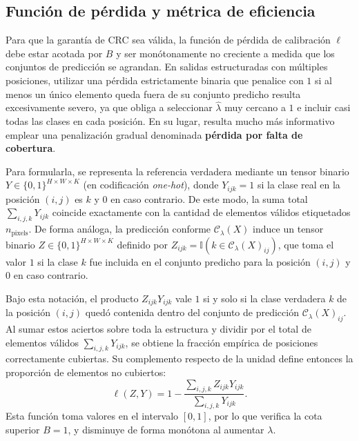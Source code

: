 \subsection{Función de pérdida y métrica de eficiencia}

Para que la garantía de CRC sea válida, la función de pérdida de calibración $\ell$ debe estar acotada por $B$ y ser monótonamente no creciente a medida que los conjuntos de predicción se agrandan. En salidas estructuradas con múltiples posiciones, utilizar una pérdida estrictamente binaria que penalice con $1$ si al menos un único elemento queda fuera de su conjunto predicho resulta excesivamente severo, ya que obliga a seleccionar $\hat{\lambda}$ muy cercano a $1$ e incluir casi todas las clases en cada posición. En su lugar, resulta mucho más informativo emplear una penalización gradual denominada \textbf{pérdida por falta de cobertura}.

Para formularla, se representa la referencia verdadera mediante un tensor binario $Y \in \{0,1\}^{H \times W \times K}$ (en codificación \textit{one-hot}), donde $Y_{ijk} = 1$ si la clase real en la posición $(i,j)$ es $k$ y $0$ en caso contrario. De este modo, la suma total $\sum_{i,j,k} Y_{ijk}$ coincide exactamente con la cantidad de elementos válidos etiquetados $n_{\text{pixels}}$. De forma análoga, la predicción conforme $\mathcal{C}_\lambda(X)$ induce un tensor binario $Z \in \{0,1\}^{H \times W \times K}$ definido por $Z_{ijk} = \mathbb{I}(k \in \mathcal{C}_\lambda(X)_{ij})$, que toma el valor $1$ si la clase $k$ fue incluida en el conjunto predicho para la posición $(i,j)$ y $0$ en caso contrario.

Bajo esta notación, el producto $Z_{ijk} Y_{ijk}$ vale $1$ si y solo si la clase verdadera $k$ de la posición $(i,j)$ quedó contenida dentro del conjunto de predicción $\mathcal{C}_\lambda(X)_{ij}$. Al sumar estos aciertos sobre toda la estructura y dividir por el total de elementos válidos $\sum_{i,j,k} Y_{ijk}$, se obtiene la fracción empírica de posiciones correctamente cubiertas. Su complemento respecto de la unidad define entonces la proporción de elementos no cubiertos:
\begin{equation}
    \ell(Z, Y) = 1 - \frac{\sum_{i,j,k} Z_{ijk} Y_{ijk}}{\sum_{i,j,k} Y_{ijk}}.
\end{equation}
Esta función toma valores en el intervalo $[0,1]$, por lo que verifica la cota superior $B = 1$, y disminuye de forma monótona al aumentar $\lambda$.

